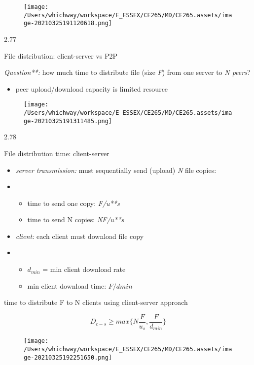 \documentclass[
]{article}
\begin{document}
\begin{figure}
\centering
\texttt{[image: /Users/whichway/workspace/E\_ESSEX/CE265/MD/CE265.assets/image-20210325191120618.png]}
\caption{}
\end{figure}

2.77

File distribution: client-server vs P2P

\emph{Question**:} how much time to distribute file (size \emph{F}) from
one server to \emph{N peers}?

\begin{itemize}
\item
  peer upload/download capacity is limited resource
\end{itemize}

\begin{figure}
\centering
\texttt{[image: /Users/whichway/workspace/E\_ESSEX/CE265/MD/CE265.assets/image-20210325191311485.png]}
\caption{}
\end{figure}

2.78

File distribution time: client-server

\begin{itemize}
\item
  \emph{server transmission:} must sequentially send (upload) \emph{N}
  file copies:
\item
  \begin{itemize}
  \item
    time to send one copy: \emph{F/u**s}
  \item
    time to send N copies: \emph{NF/u**s}
  \end{itemize}
\item
  \emph{client:} each client must download file copy
\item
  \begin{itemize}
  \item
    \(d_{min}\) = min client download rate
  \item
    min client download time: \(F/dmin\)
  \end{itemize}
\end{itemize}

time to distribute F to N clients using client-server approach

\[D_{c-s} \geq max\{N\frac{F}{u_s},\frac{F}{d_{min}}\}\]

\begin{figure}
\centering
\texttt{[image: /Users/whichway/workspace/E\_ESSEX/CE265/MD/CE265.assets/image-20210325192251650.png]}
\caption{}
\end{figure}
\end{document}
